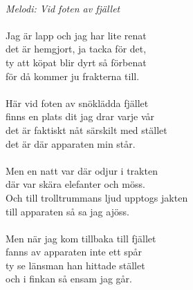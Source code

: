 \\
{\footnotesize\textit{Melodi: Vid foten av fjället}}\\
\\
Jag är lapp och jag har lite renat\\
det är hemgjort, ja tacka för det,\\
ty att köpat blir dyrt så förbenat\\
för då kommer ju frakterna till.\\
\\
Här vid foten av snöklädda fjället\\
finns en plats dit jag drar varje vår\\
det är faktiskt nåt särskilt med stället\\
det är där apparaten min står.\\
\\
Men en natt var där odjur i trakten\\
där var skära elefanter och möss.\\
Och till trolltrummans ljud upptogs jakten\\
till apparaten så sa jag ajöss.\\
\\
Men när jag kom tillbaka till fjället\\
fanns av apparaten inte ett spår\\
ty se länsman han hittade stället\\
och i finkan så ensam jag går.
